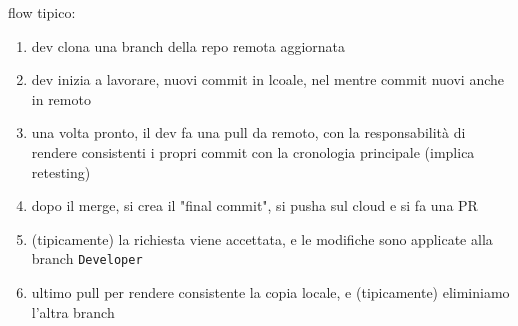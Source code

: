 flow tipico:
\begin{enumerate}
  \item dev clona una branch della repo remota aggiornata
  \item dev inizia a lavorare, nuovi commit in lcoale, nel mentre commit nuovi anche in remoto
  \item una volta pronto, il dev fa una pull da remoto, con la responsabilit\`a di rendere consistenti i propri commit con la cronologia principale (implica retesting)
  \item dopo il merge, si crea il "final commit", si pusha sul cloud e si fa una PR
  \item (tipicamente) la richiesta viene accettata, e le modifiche sono applicate alla branch \lstinline|Developer|
  \item ultimo pull per rendere consistente la copia locale, e (tipicamente) eliminiamo l'altra branch
\end{enumerate}




